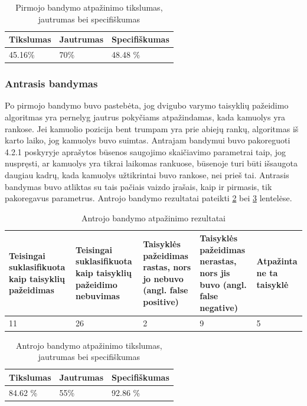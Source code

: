 \documentclass{VUMIFPSbakalaurinis}
\begin{document}
 \begin{table}[H]\footnotesize
	\centering
	\caption{Pirmojo bandymo atpažinimo tikslumas, jautrumas bei specifiškumas}
	{\begin{tabular}{|p{5cm}|p{5cm}|p{5cm}|} \hline
			\textbf{Tikslumas} & \textbf{Jautrumas} & \textbf{Specifiškumas} \\
			\hline
			45.16\%  & 70\%    & 48.48 \%    \\
			
			\hline
	\end{tabular}}
	\label{tab:first_trial_percents}
\end{table}

\subsubsection{Antrasis bandymas}

Po pirmojo bandymo buvo pastebėta, jog dvigubo varymo taisyklių pažeidimo algoritmas yra pernelyg jautrus pokyčiams atpažindamas, kada kamuolys yra rankose. Jei kamuolio pozicija bent trumpam yra prie abiejų rankų, algoritmas iš karto laiko, jog kamuolys buvo suimtas. Antrajam bandymui buvo pakoreguoti 4.2.1 poskyryje aprašytos būsenos saugojimo skaičiavimo parametrai taip, jog nuspręsti, ar kamuolys yra tikrai laikomas rankuose, būsenoje turi būti išsaugota daugiau kadrų, kada kamuolys užtikrintai buvo rankose, nei prieš tai. Antrasis bandymas buvo atliktas su tais pačiais vaizdo įrašais, kaip ir pirmasis, tik pakoregavus parametrus. Antrojo bandymo rezultatai pateikti  \ref{tab:second_trial} bei \ref{tab:second_trial_percents} lentelėse.

\begin{table}[H]\footnotesize
	\centering
	\caption{Antrojo bandymo atpažinimo rezultatai}
	{\begin{tabular}{|p{3cm}|p{3cm}|p{3cm}|p{3cm}|p{2cm}|} \hline
			\textbf{Teisingai suklasifikuota kaip taisyklių pažeidimas} & \textbf{Teisingai suklasifikuota kaip taisyklių pažeidimo nebuvimas} & \textbf{Taisyklės pažeidimas rastas, nors jo nebuvo (angl. false positive)} & \textbf{Taisyklės pažeidimas nerastas, nors jis buvo (angl. false negative)} & \textbf{Atpažinta ne ta taisyklė} \\
			\hline
			11  & 26    & 2    & 9    & 5   \\
			\hline
	\end{tabular}}
	\label{tab:second_trial}
\end{table}

\begin{table}[H]\footnotesize
	\centering
	\caption{Antrojo bandymo atpažinimo tikslumas, jautrumas bei specifiškumas}
	{\begin{tabular}{|p{5cm}|p{5cm}|p{5cm}|} \hline
			\textbf{Tikslumas} & \textbf{Jautrumas} & \textbf{Specifiškumas} \\
			\hline
			84.62 \%  & 55\%    & 92.86 \%    \\
			
			\hline
	\end{tabular}}
	\label{tab:second_trial_percents}
\end{table}
\end{document}
